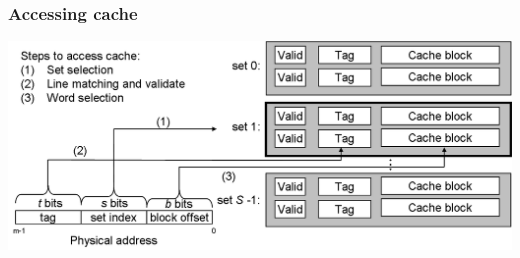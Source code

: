 \documentclass[CJKutf8,xcolor=pdftex,dvipsnames,table]{beamer}
\begin{document}
\begin{CJK*}{UTF8}{song}
  \begin{frame}
    \frametitle{Accessing cache} \pause
    \begin{center}
      \includegraphics[scale=0.5]{csappv1f6-33}
    \end{center}
  \end{frame}


\end{CJK*}
\end{document}

